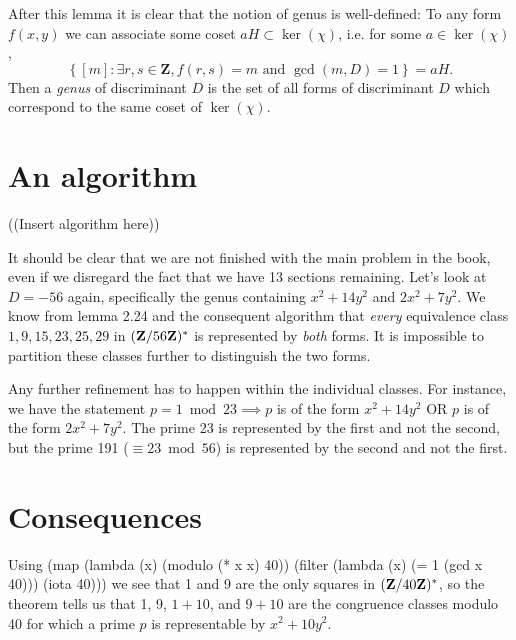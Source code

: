 After this lemma it is clear that the notion of genus is well-defined: To any form $f(x,y)$ we can associate some coset $aH\subset\ker(\chi)$, i.e. for some $a\in\ker(\chi)$,
\[\left\{[m]:\exists r,s\in\mathbf{Z}, f(r,s)=m\text{ and }\gcd(m,D)=1\right\}=aH.\]
Then a \emph{genus} of discriminant $D$ is the set of all forms of discriminant $D$ which correspond to the same coset of $\ker(\chi)$.

\section{An algorithm}

((Insert algorithm here))

It should be clear that we are not finished with the main problem in the book, even if we disregard the fact that we have 13 sections remaining. Let's look at $D=-56$ again, specifically the genus containing $x^2+14y^2$ and $2x^2+7y^2$. We know from lemma 2.24 and the consequent algorithm that \emph{every} equivalence class $1, 9, 15, 23, 25, 29$ in $(\mathbf{Z}/56\mathbf{Z})^*$ is represented by \emph{both} forms. It is impossible to partition these classes further to distinguish the two forms.

Any further refinement has to happen within the individual classes. For instance, we have the statement $p=1\bmod 23\implies p$ is of the form $x^2+14y^2$ OR $p$ is of the form $2x^2+7y^2$. The prime 23 is represented by the first and not the second, but the prime 191 ($\equiv 23\bmod 56$) is represented by the second and not the first.

\section{Consequences}

Using (map (lambda (x) (modulo (* x x) 40)) (filter (lambda (x) (= 1 (gcd x 40))) (iota 40))) we see that 1 and 9 are the only squares in $(\mathbf{Z}/40\mathbf{Z})^*$, so the theorem tells us that 1, 9, $1+10$, and $9+10$ are the congruence classes modulo 40 for which a prime $p$ is representable by $x^2+10y^2$.


